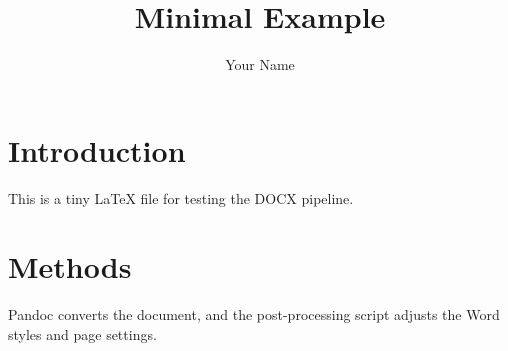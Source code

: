 \documentclass{article}
\title{Minimal Example}
\author{Your Name}
\date{}
\begin{document}
\maketitle

\section{Introduction}

This is a tiny LaTeX file for testing the DOCX pipeline.

\section{Methods}

Pandoc converts the document, and the post-processing script adjusts the Word
styles and page settings.
\end{document}
